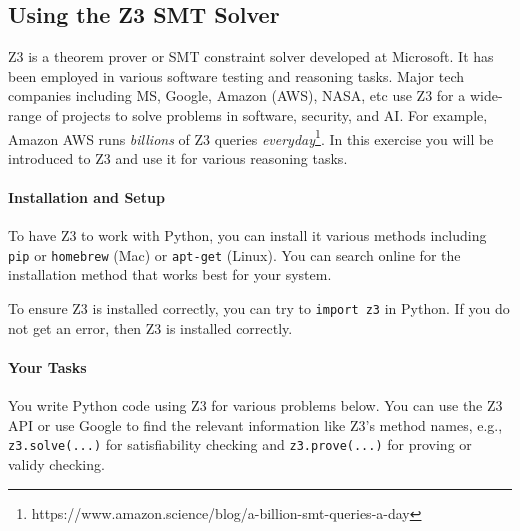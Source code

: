 \documentclass[oneside,11pt,dvipsnames]{book}
\newcommand{\code}[1]{\texttt{#1}}
\begin{document}
\subsection{Using the Z3 SMT Solver}\label{exercise:z3-smt-solver}

Z3 is a theorem prover or SMT constraint solver developed at Microsoft.  It has been employed in various software testing and reasoning tasks. Major tech companies including MS, Google, Amazon (AWS), NASA, etc use Z3 for a wide-range of projects to solve problems in software, security, and AI. For example, Amazon AWS runs \emph{billions} of Z3 queries \emph{everyday}\footnote{https://www.amazon.science/blog/a-billion-smt-queries-a-day}.  In this exercise you will be introduced to Z3 and use it for various reasoning tasks.

\paragraph{Installation and Setup}

To have Z3 to work with Python, you can install it various methods including \texttt{pip} or \texttt{homebrew} (Mac) or \texttt{apt-get} (Linux). You can search online for the installation method that works best for your system.

To ensure Z3 is installed correctly, you can try to \texttt{import z3} in Python. If you do not get an error, then Z3 is installed correctly.

\paragraph{Your Tasks} You write Python code using Z3 for various problems below. You can use the Z3 API or use Google to find the relevant information like Z3's method names, e.g., \code{z3.solve(...)} for satisfiability checking and \code{z3.prove(...)} for proving or validy checking.
\end{document}
